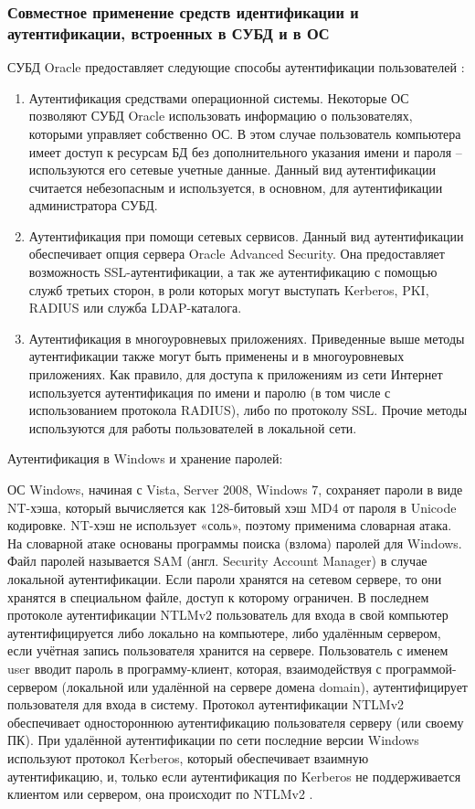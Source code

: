 \subsubsection{Совместное применение средств идентификации и аутентификации, встроенных в СУБД и в ОС}
СУБД Oracle предоставляет следующие способы аутентификации
пользователей \cite{privacy-oracle}:
\begin{enumerate}
    \item Аутентификация средствами операционной системы. Некоторые ОС
        позволяют СУБД Oracle использовать информацию о пользователях, которыми
        управляет собственно ОС. В этом случае пользователь компьютера имеет доступ к
        ресурсам БД без дополнительного указания имени и пароля – используются его
        сетевые учетные данные. Данный вид аутентификации считается небезопасным и
        используется, в основном, для аутентификации администратора СУБД.
    \item Аутентификация при помощи сетевых сервисов. Данный вид аутентификации
        обеспечивает опция сервера Oracle Advanced Security. Она предоставляет
        возможность SSL-аутентификации, а так же аутентификацию с помощью служб
        третьих сторон, в роли которых могут выступать Kerberos, PKI, RADIUS или служба
        LDAP-каталога.
    \item Аутентификация в многоуровневых приложениях. Приведенные выше
        методы аутентификации также могут быть применены и в многоуровневых
        приложениях. Как правило, для доступа к приложениям из сети Интернет используется
        аутентификация по имени и паролю (в том числе с использованием протокола
        RADIUS), либо по протоколу SSL. Прочие методы используются для работы
        пользователей в локальной сети.
\end{enumerate}

Аутентификация в Windows и хранение паролей:

ОС Windows, начиная с Vista, Server 2008, Windows 7, сохраняет пароли в виде NT-хэша, который
вычисляется как 128-битовый хэш MD4 от пароля в Unicode кодировке. NT-хэш не использует «соль»,
поэтому применима словарная атака. На словарной атаке основаны программы поиска (взлома) паролей
для Windows. Файл паролей называется SAM (англ. Security Account Manager) в случае локальной
аутентификации. Если пароли хранятся на сетевом сервере, то они хранятся в специальном файле,
доступ к которому ограничен.
В последнем протоколе аутентификации NTLMv2 пользователь для входа в свой компьютер
аутентифицируется либо локально на компьютере, либо удалённым сервером, если учётная запись
пользователя хранится на сервере.
Пользователь с именем user вводит пароль в программу-клиент, которая, взаимодействуя с
программой-сервером (локальной или удалённой на сервере домена domain), аутентифицирует
пользователя для входа в систему.
Протокол аутентификации NTLMv2 обеспечивает одностороннюю аутентификацию пользователя серверу (или
своему ПК).
При удалённой аутентификации по сети последние версии Windows используют протокол Kerberos, который
обеспечивает взаимную аутентификацию, и, только если аутентификация по Kerberos не поддерживается
клиентом или сервером, она происходит по NTLMv2 \cite{crypto-methods}.

